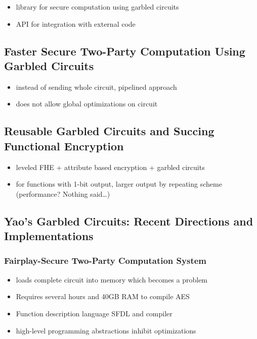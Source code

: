 \cite{VMCrypt}
\begin{itemize}
\item library for secure computation using garbled circuits
\item API for integration with external code
\end{itemize}

\subsection{Faster Secure Two-Party Computation Using Garbled Circuits}
\label{sec:faster-secure-two}

\cite{FasterCircuits}
\begin{itemize}
\item instead of sending whole circuit, pipelined approach
\item does not allow global optimizations on circuit
\end{itemize}

\subsection{Reusable Garbled Circuits and Succing Functional Encryption}
\label{sec:reus-garbl-circ}

\cite{ReusableGC}
\begin{itemize}
\item leveled FHE + attribute based encryption + garbled circuits
\item for functions with 1-bit output, larger output by repeating
  scheme (performance? Nothing said\dots)
\end{itemize}

\subsection{Yao's Garbled Circuits: Recent Directions and
  Implementations}
\label{sec:yaos-garbl-circ}

\cite{GCRecent}

\subsubsection{Fairplay-Secure Two-Party Computation System}
\label{sec:fairplay-secure-two}

\cite{Fairplay}

\begin{itemize}
\item loads complete circuit into memory which becomes a problem
\item Requires several hours and 40GB RAM to compile AES
\item Function description language SFDL and compiler
\item high-level programming abstractions inhibit optimizations
\end{itemize}

